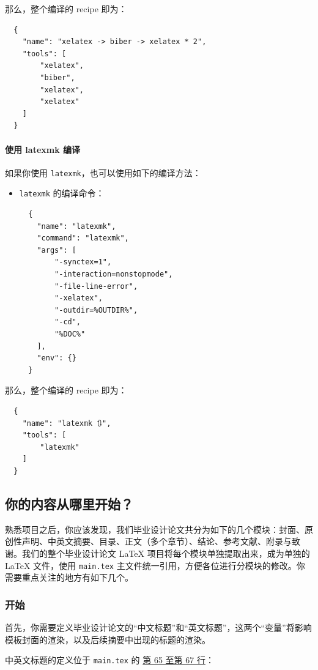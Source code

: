 那么，整个编译的 recipe 即为：

\begin{verbatim}
  {
    "name": "xelatex -> biber -> xelatex * 2",
    "tools": [
        "xelatex",
        "biber",
        "xelatex",
        "xelatex"
    ]
  }
\end{verbatim}

\paragraph{使用 latexmk 编译}
如果你使用 \texttt{latexmk}，也可以使用如下的编译方法：

\begin{itemize}
  \item \texttt{latexmk} 的编译命令：
  \begin{verbatim}
  {
    "name": "latexmk",
    "command": "latexmk",
    "args": [
        "-synctex=1",
        "-interaction=nonstopmode",
        "-file-line-error",
        "-xelatex",
        "-outdir=%OUTDIR%",
        "-cd",
        "%DOC%"
    ],
    "env": {}
  }
  \end{verbatim}
\end{itemize}

那么，整个编译的 recipe 即为：
\begin{verbatim}
  {
    "name": "latexmk 🔃",
    "tools": [
        "latexmk"
    ]
  }
\end{verbatim}

\subsection{你的内容从哪里开始？}

熟悉项目之后，你应该发现，我们毕业设计论文共分为如下的几个模块：封面、原创性声明、中英文摘要、目录、正文（多个章节）、结论、参考文献、附录与致谢。我们的整个毕业设计论文 {\LaTeX} 项目将每个模块单独提取出来，成为单独的 {\LaTeX} 文件，使用 \texttt{main.tex} 主文件统一引用，方便各位进行分模块的修改。你需要重点关注的地方有如下几个。

\subsubsection{开始}

首先，你需要定义毕业设计论文的“中文标题”和“英文标题”，这两个“变量”将影响模板封面的渲染，以及后续摘要中出现的标题的渲染。

中英文标题的定义位于 \texttt{main.tex} 的 \href{https://github.com/spencerwooo/BIThesis/blob/master/graduation-thesis/main.tex#L65-L67}{第 65 至第 67 行}：

